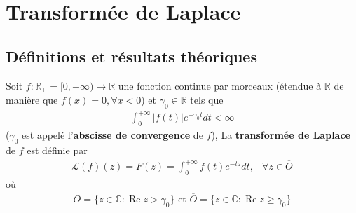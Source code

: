 \chapter{Transformée de Laplace}
\section{Définitions et résultats théoriques}

\begin{myDefinition}
	Soit $f: \mathbb R_+=[0,+\infty)\rightarrow\mathbb R$ une fonction continue par morceaux (étendue à $\mathbb R$ de manière que $f(x)=0,\forall x<0$) et $\gamma_0\in\mathbb R$ tels que
	\begin{eqnarray}
		\int_{0}^{+\infty}|f(t)|e^{-\gamma_0t}dt<\infty
	\end{eqnarray}
	($\gamma_0$ est appelé l'\textbf{abscisse de convergence} de $f$), La \textbf{transformée de Laplace} de $f$ est définie par
	\begin{eqnarray}
		\mathcal L(f)(z)=F(z)=\int_0^{+\infty}f(t)e^{-tz}dt,&\forall z\in\overline O
	\end{eqnarray}
	où
	\begin{eqnarray*}
		O=\{z\in\mathbb C: \mathop{Re}z>\gamma_0\}\text{ et }\overline O=\{z\in\mathbb C: \mathop{Re}z\geq\gamma_0\}
	\end{eqnarray*}
\end{myDefinition}

